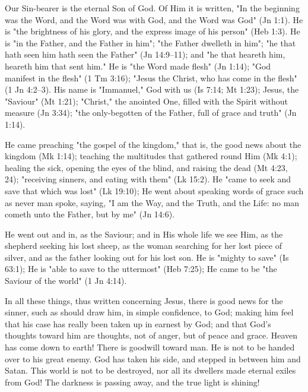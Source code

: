 \documentclass[
]{book}
\begin{document}
Our Sin-bearer is the eternal Son of God. Of Him it is written, "In the beginning was the Word, and the Word was with God, and the Word was God" (Jn 1:1). He is "the brightness of his glory, and the express image of his person" (Heb 1:3). He is "in the Father, and the Father in him"; "the Father dwelleth in him"; "he that hath seen him hath seen the Father" (Jn 14:9--11); and "he that heareth him, heareth him that sent him." He is "the Word made flesh" (Jn 1:14); "God manifest in the flesh" (1 Tm 3:16); "Jesus the Christ, who has come in the flesh" (1 Jn 4:2--3). His name is "Immanuel," God with us (Is 7:14; Mt 1:23); Jesus, the "Saviour" (Mt 1:21); "Christ," the anointed One, filled with the Spirit without measure (Jn 3:34); "the only-begotten of the Father, full of grace and truth" (Jn 1:14).

He came preaching "the gospel of the kingdom," that is, the good news about the kingdom (Mk 1:14); teaching the multitudes that gathered round Him (Mk 4:1); healing the sick, opening the eyes of the blind, and raising the dead (Mt 4:23, 24); "receiving sinners, and eating with them" (Lk 15:2). He "came to seek and save that which was lost" (Lk 19:10); He went about speaking words of grace such as never man spoke, saying, "I am the Way, and the Truth, and the Life: no man cometh unto the Father, but by me" (Jn 14:6).

He went out and in, as the Saviour; and in His whole life we see Him, as the shepherd seeking his lost sheep, as the woman searching for her lost piece of silver, and as the father looking out for his lost son. He is "mighty to save" (Is 63:1); He is "able to save to the uttermost" (Heb 7:25); He came to be "the Saviour of the world" (1 Jn 4:14).

In all these things, thus written concerning Jesus, there is good news for the sinner, such as should draw him, in simple confidence, to God; making him feel that his case has really been taken up in earnest by God; and that God's thoughts toward him are thoughts, not of anger, but of peace and grace. Heaven has come down to earth! There is goodwill toward man. He is not to be handed over to his great enemy. God has taken his side, and stepped in between him and Satan. This world is not to be destroyed, nor all its dwellers made eternal exiles from God! The darkness is passing away, and the true light is shining!
\end{document}
